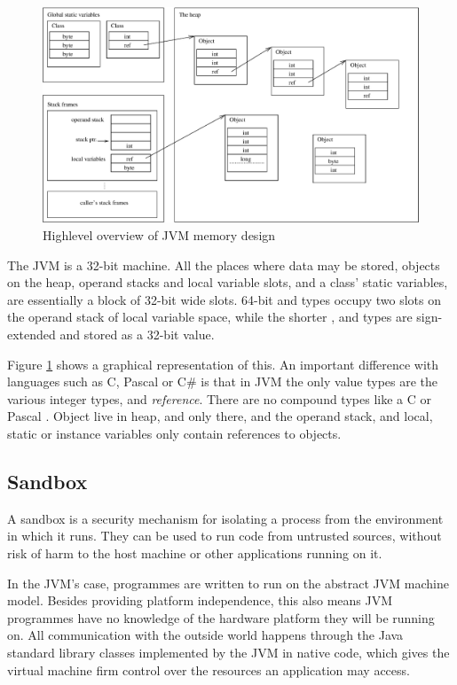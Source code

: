 \begin{figure}
  \centering
  \includegraphics[width=\linewidth]{jvmmemory.eps}
  \caption{Highlevel overview of JVM memory design}
  \label{fig-jvm-memory}
\end{figure}

The JVM is a 32-bit machine. All the places where data may be stored, objects on the heap, operand stacks and local variable slots, and a class' static variables, are essentially a block of 32-bit wide slots. 64-bit  and  types occupy two slots on the operand stack of local variable space, while the shorter , and  types are sign-extended and stored as a 32-bit value.
  
Figure \ref{fig-jvm-memory} shows a graphical representation of this. An important difference with languages such as C, Pascal or C\# is that in JVM the only value types are the various integer types, and \emph{reference}. There are no compound types like a C  or Pascal . Object live in heap, and only there, and the operand stack, and local, static or instance variables only contain references to objects.

\subsection{Sandbox}
A sandbox is a security mechanism for isolating a process from the environment in which it runs. They can be used to run code from untrusted sources, without risk of harm to the host machine or other applications running on it.

In the JVM's case, programmes are written to run on the abstract JVM machine model. Besides providing platform independence, this also means JVM programmes have no knowledge of the hardware platform they will be running on. All communication with the outside world happens through the Java standard library classes implemented by the JVM in native code, which gives the virtual machine firm control over the resources an application may access.

